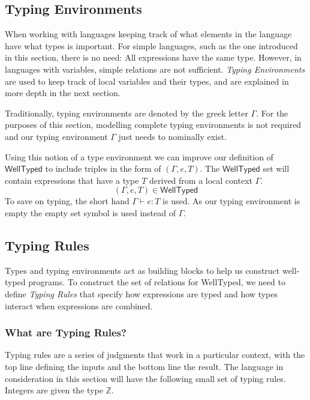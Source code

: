 \subsection{Typing Environments}
\label{sec:typed-arith:type-env}

When working with languages keeping track of what elements in the language have what types is important.
For simple languages, such as the one introduced in this section, there is no need: All expressions have the same type.
However, in languages with variables, simple relations are not sufficient.
\emph{Typing Environments} are used to keep track of local variables and their types, and are explained in more depth in the next section.

Traditionally, typing environments are denoted by the greek letter $\Gamma$.
For the purposes of this section, modelling complete typing environments is not required and our typing environment $\Gamma$ just needs to nominally exist.

Using this notion of a type environment we can improve our definition of $\mathsf{WellTyped}$ to include triples in the form of $(\Gamma,e,T)$.
The $\mathsf{WellTyped}$ set will contain expressions that have a type $T$ derived from a local context $\Gamma$.
\[
(\Gamma,e,T)\in\mathsf{WellTyped}
\]
\noindent
To save on typing, the short hand $\Gamma\vdash e:T$ is used.
As our typing environment is empty the empty set symbol is used instead of $\Gamma$.

\subsection{Typing Rules}
\label{sec:typed-arith:rules}

Types and typing environments act as building blocks to help us construct well-typed programs.
To construct the set of relations for \textsf{WellTyped}, we need to define \emph{Typing Rules} that specify how expressions are typed and how types interact when expressions are combined.

\subsubsection{What are Typing Rules?}
\label{sec:typed-arith:rules:what}

Typing rules are a series of judgments that work in a particular context, with the top line defining the inputs and the bottom line the result.
The language in consideration in this section will have the following small set of typing rules.
Integers are given the type $\mathbb{Z}$.

